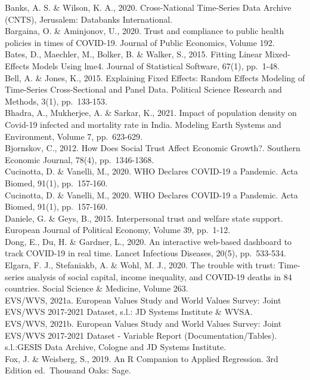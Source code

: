 \documentclass[
  12pt,
]{article}
\begin{document}
Banks, A. S. \& Wilson, K. A., 2020. Cross-National Time-Series Data Archive (CNTS), Jerusalem: Databanks International.\\
Bargaina, O. \& Aminjonov, U., 2020. Trust and compliance to public health policies in times of COVID-19. Journal of Public Economics, Volume 192.\\
Bates, D., Maechler, M., Bolker, B. \& Walker, S., 2015. Fitting Linear Mixed-Effects Models Using lme4. Journal of Statistical Software, 67(1), pp.~1-48.\\
Bell, A. \& Jones, K., 2015. Explaining Fixed Effects: Random Effects Modeling of Time-Series Cross-Sectional and Panel Data. Political Science Research and Methods, 3(1), pp.~133-153.\\
Bhadra, A., Mukherjee, A. \& Sarkar, K., 2021. Impact of population density on Covid-19 infected and mortality rate in India. Modeling Earth Systems and Environment, Volume 7, pp.~623-629.\\
Bjornskov, C., 2012. How Does Social Trust Affect Economic Growth?. Southern Economic Journal, 78(4), pp.~1346-1368.\\
Cucinotta, D. \& Vanelli, M., 2020. WHO Declares COVID-19 a Pandemic. Acta Biomed, 91(1), pp.~157-160.\\
Cucinotta, D. \& Vanelli, M., 2020. WHO Declares COVID-19 a Pandemic. Acta Biomed, 91(1), pp.~157-160.\\
Daniele, G. \& Geys, B., 2015. Interpersonal trust and welfare state support. European Journal of Political Economy, Volume 39, pp.~1-12.\\
Dong, E., Du, H. \& Gardner, L., 2020. An interactive web-based dashboard to track COVID-19 in real time. Lancet Infectious Diseases, 20(5), pp.~533-534.\\
Elgara, F. J., Stefaniakb, A. \& Wohl, M. J., 2020. The trouble with trust: Time-series analysis of social capital, income inequality, and COVID-19 deaths in 84 countries. Social Science \& Medicine, Volume 263.\\
EVS/WVS, 2021a. European Values Study and World Values Survey: Joint EVS/WVS 2017-2021 Dataset, s.l.: JD Systems Institute \& WVSA.\\
EVS/WVS, 2021b. European Values Study and World Values Survey: Joint EVS/WVS 2017-2021 Dataset - Variable Report (Documentation/Tables). s.l.:GESIS Data Archive, Cologne and JD Systems Institute.\\
Fox, J. \& Weisberg, S., 2019. An R Companion to Applied Regression. 3rd Edition ed.~Thousand Oaks: Sage.\\
\end{document}
